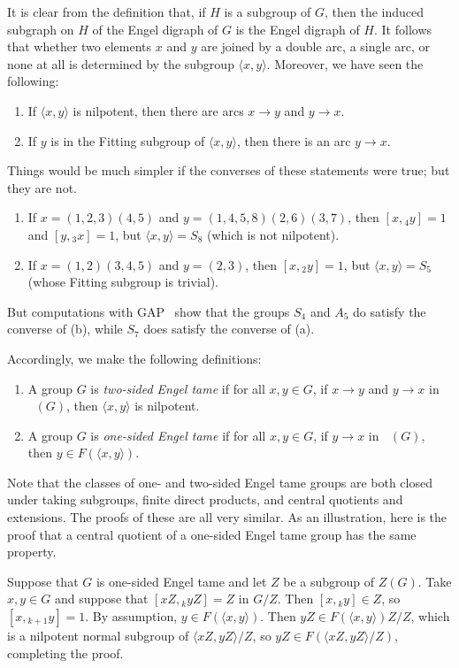 \documentclass[reqno,12pt]{amsart}
\theoremstyle{plain}
\theoremstyle{definition}
\newcommand{\deng}{\mathop{\overrightarrow{\mathcal{E}}}}
\begin{document}
It is clear from the definition that, if $H$ is a subgroup of $G$, then the
induced subgraph on $H$ of the Engel digraph of $G$ is the Engel digraph of
$H$. It follows that whether two elements $x$ and $y$ are joined by a double
arc, a single arc, or none at all is determined by the subgroup
$\langle x,y\rangle$. Moreover, we have seen the following:
\begin{enumerate}
\item If $\langle x,y\rangle$ is nilpotent, then there are arcs $x\to y$
and $y\to x$.
\item If $y$ is in the Fitting subgroup of $\langle x,y\rangle$, then there
is an arc $y\to x$.
\end{enumerate}
Things would be much simpler if the converses of these statements were true;
but they are not.
\begin{enumerate}
\item If $x=(1,2,3)(4,5)$ and $y=(1,4,5,8)(2,6)(3,7)$, then $[x,{}_4y]=1$ and
$[y,{}_3x]=1$, but $\langle x,y\rangle=S_8$ (which is not nilpotent).
\item If $x=(1,2)(3,4,5)$ and $y=(2,3)$, then $[x,{}_2y]=1$, but 
$\langle x,y\rangle=S_5$ (whose Fitting subgroup is trivial).
\end{enumerate}

But computations with \textsf{GAP}~\cite{gap} show that the groups $S_4$ and
$A_5$ do satisfy the converse of (b), while $S_7$ does satisfy the converse
of (a).

Accordingly, we make the following definitions:
\begin{enumerate}
\item A group $G$ is \emph{two-sided Engel tame} if for all $x,y\in G$, if
$x\to y$ and $y\to x$ in $\deng(G)$, then $\langle x,y\rangle$ is nilpotent.
\item A group $G$ is \emph{one-sided Engel tame} if for all $x,y\in G$, if
$y\to x$ in $\deng(G)$, then $y\in F(\langle x,y\rangle)$.
\end{enumerate}
Note that the classes of one- and two-sided Engel tame groups are both
closed under taking subgroups, finite direct products, and central quotients
and extensions. The proofs of these are all very similar. As an illustration,
here is the proof that a central quotient of a one-sided Engel tame group has
the same property.

Suppose that $G$ is one-sided Engel tame and let $Z$ be a subgroup of $Z(G)$.
Take $x,y\in G$ and suppose that $[xZ,{}_kyZ]=Z$ in $G/Z$. Then
$[x,{}_ky]\in Z$, so $[x,{}_{k+1}y]=1$. By assumption,
$y\in F(\langle x,y\rangle)$. Then
$yZ\in F(\langle x,y\rangle)Z/Z$, which is a nilpotent normal subgroup of
$\langle xZ,yZ\rangle/Z$, so $yZ\in F(\langle xZ,yZ\rangle/Z)$, completing
the proof.
\end{document}
